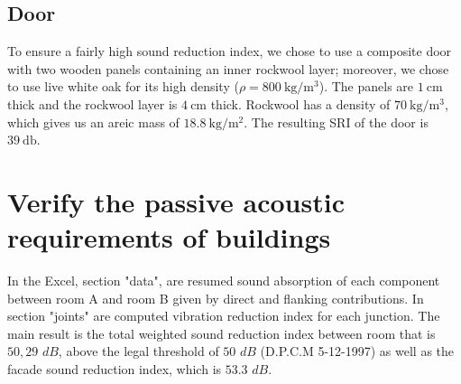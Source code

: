 \documentclass[]{scrartcl}
\begin{document}
\subsection{Door}

To ensure a fairly high sound reduction index, we chose to use a composite door with two wooden panels containing an inner rockwool layer; moreover, we chose to use live white oak for its high density \cite{wood} ($\rho = \SI{800}{\kilogram\per\meter\cubed}$). The panels are $\SI{1}{\centi\meter}$ thick and the rockwool layer is $\SI{4}{\centi\meter}$ thick. Rockwool has a density of $\SI{70}{\kilogram\per\meter\cubed}$, which gives us an areic mass of $\SI{18.8}{\kilogram\per \meter\squared}$. The resulting SRI of the door is $\SI{39}{\decibel}$.

\section{Verify the passive acoustic requirements of buildings}  

In the Excel, section "data", are resumed sound absorption of each component between room A and room B given by direct and flanking contributions. In section "joints" are computed  vibration reduction index for each junction. The main result is the total weighted sound reduction index between room that is  $50,29$ $dB$, above the legal threshold of $50$ $dB$ (D.P.C.M 5-12-1997) as well as the facade sound reduction index, which is $53.3$ $dB$. 

\printbibliography
\end{document}
